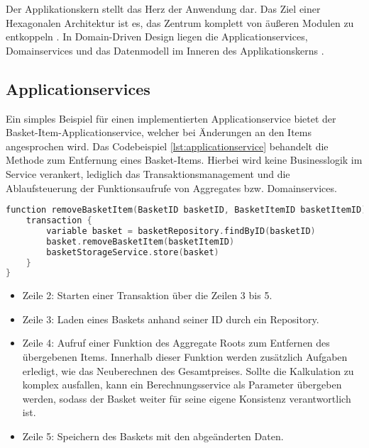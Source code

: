 Der Applikationskern stellt das Herz der Anwendung dar. Das Ziel einer Hexagonalen Architektur ist es, das Zentrum komplett von äußeren Modulen zu entkoppeln \cite{Cockburn.Hexagonal}. In Domain-Driven Design liegen die Applicationservices, Domainservices und das Datenmodell im Inneren des Applikationskerns \cite[S. 125ff.]{Vernon.2015}. 

\subsection{Applicationservices}

Ein simples Beispiel für einen implementierten Applicationservice bietet der Basket-Item-Applicationservice, welcher bei Änderungen an den Items angesprochen wird. Das Codebeispiel \ref{lst:applicationservice} behandelt die Methode zum Entfernung eines Basket-Items. Hierbei wird keine Businesslogik im Service verankert, lediglich das Transaktionsmanagement und die Ablaufsteuerung der Funktionsaufrufe von Aggregates bzw. Domainservices.

\vspace{0.5cm}
\begin{minipage}{\linewidth} %
	\begin{lstlisting}[caption={Funktion zum Entfernen von Basket-Items in einem Applicationservice}, label={lst:applicationservice}, language=Kotlin]
function removeBasketItem(BasketID basketID, BasketItemID basketItemID) {
	transaction {
		variable basket = basketRepository.findByID(basketID)
		basket.removeBasketItem(basketItemID)
		basketStorageService.store(basket)
	}
}
	\end{lstlisting}

	\begin{itemize}
		\setlength\itemsep{-1pt}
		\item Zeile 2: Starten einer Transaktion über die Zeilen 3 bis 5.
		\item Zeile 3: Laden eines Baskets anhand seiner ID durch ein Repository. 
		\item Zeile 4: Aufruf einer Funktion des Aggregate Roots zum Entfernen des übergebenen Items. Innerhalb dieser Funktion werden zusätzlich Aufgaben erledigt, wie das Neuberechnen des Gesamtpreises. Sollte die Kalkulation zu komplex ausfallen, kann ein Berechnungsservice als Parameter übergeben werden, sodass der Basket weiter für seine eigene Konsistenz verantwortlich ist. 
		\item Zeile 5: Speichern des Baskets mit den abgeänderten Daten.
	\end{itemize}
\end{minipage}

